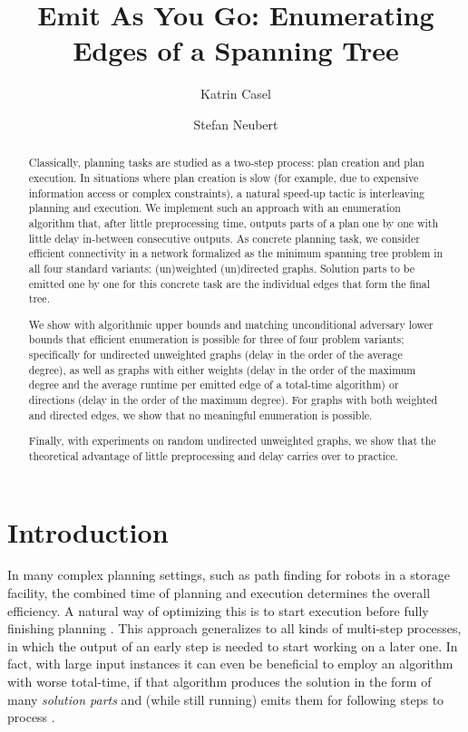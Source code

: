 \documentclass[a4paper, USenglish, cleveref, autoref, thm-restate]{lipics-v2021}
\title{Emit As You Go: Enumerating Edges of a Spanning Tree}
\author{Katrin Casel}{Humboldt Universität zu Berlin, Germany}{Katrin.Casel@hu-berlin.de}{https://orcid.org/0000-0001-6146-8684}{}
\author{Stefan Neubert}{Hasso Plattner Institute, University of Potsdam, Germany}{Stefan.Neubert@hpi.de}{https://orcid.org/0000-0001-9148-6592}{}
\begin{document}
\maketitle

\begin{abstract}
	Classically, planning tasks are studied as a two-step process: plan creation and plan execution.
	In situations where plan creation is slow (for example, due to expensive information access or complex constraints), a natural speed-up tactic is interleaving planning and execution.
	We implement such an approach with an enumeration algorithm that, after little preprocessing time, outputs parts of a plan one by one with little delay in-between consecutive outputs.
	As concrete planning task, we consider efficient connectivity in a network formalized as the minimum spanning tree problem in all four standard variants: (un)weighted (un)directed graphs.
	Solution parts to be emitted one by one for this concrete task are the individual edges that form the final tree.

	We show with algorithmic upper bounds and matching unconditional adversary lower bounds that efficient enumeration is possible for three of four problem variants;
	specifically for undirected unweighted graphs (delay in the order of the average degree), as well as graphs with either weights (delay in the order of the maximum degree and the average runtime per emitted edge of a total-time algorithm) or directions (delay in the order of the maximum degree).
	For graphs with both weighted and directed edges, we show that no meaningful enumeration is possible.

	Finally, with experiments on random undirected unweighted graphs, we show that the theoretical advantage of little preprocessing and delay carries over to practice.
\end{abstract}

\section{Introduction}
\label{sec:introduction}

In many complex planning settings, such as path finding for robots in a storage facility, the combined time of planning and execution determines the overall efficiency.
A natural way of optimizing this is to start execution before fully finishing planning \cite{zhangPlanningExecutionMultiAgent2024, neubertIncrementalOrderingScheduling2024}.
This approach generalizes to all kinds of multi-step processes, in which the output of an early step is needed to start working on a later one.
In fact, with large input instances it can even be beneficial to employ an algorithm with worse total-time, if that algorithm produces the solution in the form of many \textit{solution parts} and (while still running) emits them for following steps to process \cite{lindnerHiLiveRealtimeMapping2017}.
\end{document}
